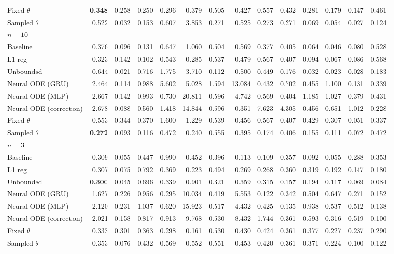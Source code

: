 \begin{tabular}{lrrrrrrrrrrrrr}
Fixed $\theta$ & \textbf{0.348} & 0.258 & 0.250 & 0.296 & 0.379 & 0.505 & 0.427 & 0.557 & 0.432 & 0.281 & 0.179 & 0.147 & 0.461 \\
Sampled $\theta$ & 0.522 & 0.032 & 0.153 & 0.607 & 3.853 & 0.271 & 0.525 & 0.273 & 0.271 & 0.069 & 0.054 & 0.027 & 0.124 \\
\midrule
\multicolumn{14}{l}{\textbf{$n=10$}} \\
Baseline & 0.376 & 0.096 & 0.131 & 0.647 & 1.060 & 0.504 & 0.569 & 0.377 & 0.405 & 0.064 & 0.046 & 0.080 & 0.528 \\
L1 reg & 0.323 & 0.142 & 0.102 & 0.543 & 0.285 & 0.537 & 0.479 & 0.567 & 0.407 & 0.094 & 0.067 & 0.086 & 0.568 \\
Unbounded & 0.644 & 0.021 & 0.716 & 1.775 & 3.710 & 0.112 & 0.500 & 0.449 & 0.176 & 0.032 & 0.023 & 0.028 & 0.183 \\
Neural ODE (GRU) & 2.464 & 0.114 & 0.988 & 5.602 & 5.028 & 1.594 & 13.084 & 0.432 & 0.702 & 0.455 & 1.100 & 0.131 & 0.339 \\
Neural ODE (MLP) & 2.667 & 0.142 & 0.993 & 0.730 & 20.811 & 0.596 & 4.742 & 0.569 & 0.404 & 1.185 & 1.027 & 0.379 & 0.431 \\
Neural ODE (correction) & 2.678 & 0.088 & 0.560 & 1.418 & 14.844 & 0.596 & 0.351 & 7.623 & 4.305 & 0.456 & 0.651 & 1.012 & 0.228 \\
Fixed $\theta$ & 0.553 & 0.344 & 0.370 & 1.600 & 1.229 & 0.539 & 0.456 & 0.567 & 0.407 & 0.429 & 0.307 & 0.051 & 0.337 \\
Sampled $\theta$ & \textbf{0.272} & 0.093 & 0.116 & 0.472 & 0.240 & 0.555 & 0.395 & 0.174 & 0.406 & 0.155 & 0.111 & 0.072 & 0.472 \\
\midrule
\multicolumn{14}{l}{\textbf{$n=3$}} \\
Baseline & 0.309 & 0.055 & 0.447 & 0.990 & 0.452 & 0.396 & 0.113 & 0.109 & 0.357 & 0.092 & 0.055 & 0.288 & 0.353 \\
L1 reg & 0.307 & 0.075 & 0.792 & 0.369 & 0.223 & 0.494 & 0.269 & 0.268 & 0.360 & 0.319 & 0.192 & 0.147 & 0.180 \\
Unbounded & \textbf{0.300} & 0.045 & 0.696 & 0.339 & 0.901 & 0.321 & 0.359 & 0.315 & 0.157 & 0.194 & 0.117 & 0.069 & 0.084 \\
Neural ODE (GRU) & 1.627 & 0.226 & 0.956 & 0.295 & 10.034 & 0.419 & 5.553 & 0.122 & 0.342 & 0.504 & 0.647 & 0.271 & 0.152 \\
Neural ODE (MLP) & 2.120 & 0.231 & 1.037 & 0.620 & 15.923 & 0.517 & 4.432 & 0.425 & 0.135 & 0.938 & 0.537 & 0.512 & 0.138 \\
Neural ODE (correction) & 2.021 & 0.158 & 0.817 & 0.913 & 9.768 & 0.530 & 8.432 & 1.744 & 0.361 & 0.593 & 0.316 & 0.519 & 0.100 \\
Fixed $\theta$ & 0.333 & 0.301 & 0.363 & 0.298 & 0.161 & 0.530 & 0.430 & 0.424 & 0.361 & 0.377 & 0.227 & 0.237 & 0.290 \\
Sampled $\theta$ & 0.353 & 0.076 & 0.432 & 0.569 & 0.552 & 0.551 & 0.453 & 0.420 & 0.361 & 0.371 & 0.224 & 0.100 & 0.122 \\
\bottomrule
\end{tabular}
